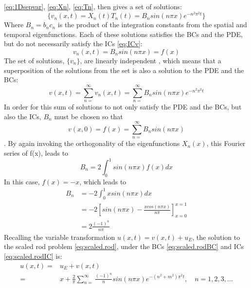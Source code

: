 \documentclass[%
oneside,                 %
final,                   %
10pt]{article}
\begin{document}
\eqref{eq:1Dsepvar}, \eqref{eq:Xn}, \eqref{eq:Tn}, then gives a set of solutions:
\begin{equation}
\{ v_n(x,t)=X_n(t)T_n(t)=B_n sin(n\pi x)e^{-n^2\pi^2t} \}
\end{equation}
Where $B_n=b_n c_n$ is the product of the integration constants from the spatial and temporal eigenfunctions. Each of these solutions satisfies the BCs and the PDE, but do not necessarily satisfy the ICs \eqref{eq:ICv}:
\begin{equation*}
v_n(x,t)=B_n sin(n\pi x)=f(x)
\end{equation*}
The set of solutions, $\{v_n\}$, are linearly independent \citep[p.150]{ravi}, which means that a superposition of the solutions from the set is also a solution to the PDE and the BCs:
\begin{equation}
v(x,t)=\sum_{n=}^{\infty} v_n(x,t)  =\sum_{n=}^{\infty} B_n sin(n\pi x) e^{-n^2\pi^2t}
\end{equation}
In order for this sum of solutions to not only satisfy the PDE and the BCs, but also the ICs, $B_n$ must be chosen so that 
\begin{equation}
v(x,0)=f(x)=\sum_{n=}^{\infty} B_n sin(n\pi x)
\end{equation}.
By again invoking the orthogonality of the eigenfunctions $X_n(x)$, this Fourier series of f(x), leads to
\begin{equation}
B_n=2 \int_0^1 sin(n\pi x)f(x) dx
\end{equation}
In this case, $f(x)=-x$, which leads to
\begin{align*}
B_n&=-2 \int_0^1 xsin(n\pi x) dx \\
&=-2\left[sin(n\pi x)- \frac{x cos(n\pi x)}{n\pi}\right]_{x=0}^{x=1} \\
&=2\frac{(-1)^n}{n\pi}
\end{align*}
Recalling the variable transformation $u(x,t)=v(x,t)+u_E$, the solution to the scaled rod problem \eqref{eq:scaled.rod}, under the BCs \eqref{eq:scaled.rodBC} and ICs \eqref{eq:scaled.rodIC} is: 
\begin{align}
u(x,t)=&u_E+v(x,t) \\
=& x + \frac{2}{\pi}\sum_{n=}^{\infty} \frac{(-1)^{n}}{n} sin(n\pi x) e^{-(n^2+m^2)\pi^2t}, \quad n=1,2,3,... 
\end{align}
\end{document}
